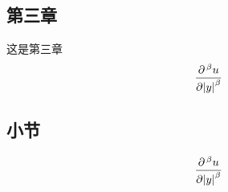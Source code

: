 \documentclass[11pt]{article}
\begin{document}
\begin{CJK}{UTF8}{gbsn}
\section{第三章}{这是第三章}
\begin{gather}
	\frac{\partial^{\,\beta}u}{\partial{\vert y \vert}^{\beta}}
\end{gather}
\subsection{小节}
\begin{multline}
		\frac{\partial^{\,\beta}u}{\partial{\vert y \vert}^{\beta}}
\end{multline}
\end{CJK}
\end{document}
